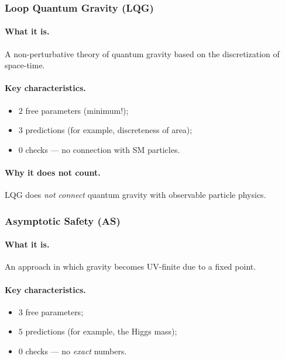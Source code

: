 \documentclass[11pt,a4paper]{article}
\theoremstyle{definition}
\begin{document}
\subsubsection{Loop Quantum Gravity (LQG)}

\paragraph{What it is.} 
A non-perturbative theory of quantum gravity based 
on the discretization of space-time.

\paragraph{Key characteristics.}
\begin{itemize}
    \item $2$ free parameters (minimum!);
    \item $3$ predictions (for example, discreteness of area);
    \item $0$ checks — no connection with SM particles.
\end{itemize}

\paragraph{Why it does not count.}
LQG does \emph{not connect} quantum gravity 
with observable particle physics.

\subsubsection{Asymptotic Safety (AS)}

\paragraph{What it is.} 
An approach in which gravity becomes 
UV-finite due to a fixed point.

\paragraph{Key characteristics.}
\begin{itemize}
    \item $3$ free parameters;
    \item $5$ predictions (for example, the Higgs mass);
    \item $0$ checks — no \emph{exact} numbers.
\end{itemize}
\end{document}
